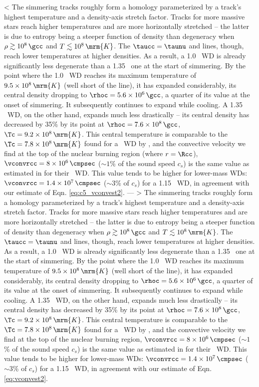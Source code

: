 < The simmering tracks roughly form a homology parameterized by a track's highest temperature and a density-axis stretch factor.  Tracks for more massive stars reach higher temperatures and are more horizontally stretched -- the latter is due to entropy being a steeper function of density than degeneracy when $\rho\gtrsim10^8\,\gcc$ and $T\lesssim10^8\,\mrm{K}$.  The $\taucc = \taunu$ and \citeal{wooswk04} lines, though, reach lower temperatures at higher densities.  As a result, a 1.0 \Msun\ WD is already significantly less degenerate than a 1.35 \Msun\ one at the start of simmering.  By the point where the 1.0 \Msun\ WD reaches its maximum temperature of $9.5\times10^8\,\mrm{K}$ (well short of the \citeal{wooswk04} line), it has expanded considerably, its central density dropping to $\rhoc = 5.6\times10^6\,\gcc$, a quarter of its value at the onset of simmering.  It subsequently continues to expand while cooling.  A 1.35 \Msun\ WD, on the other hand, expands much less drastically -- its central density has decreased by 35\% by its \citeal{wooswk04} point at $\rhoc = 7.6\times10^8\,\gcc$, $\Tc = 9.2\times10^8\,\mrm{K}$.  This central temperature is comparable to the $\Tc = 7.8\times10^8\,\mrm{K}$ found for a \Mch\ WD by \citeal{wooswk04}, and the convective velocity we find at the top of the nuclear burning region (where $r = \Rcc$), $\vconvrcc = 8\times10^6\,\cmpsec$ ($\sim1$\% of the sound speed $c_s$) is the same value as estimated in \citeal{wooswk04} for their \Mch\ WD.  This value tends to be higher for lower-mass WDs: $\vconvrcc = 1.4\times10^7\,\cmpsec$ ($\sim3$\% of $c_s$) for a 1.15 \Msun\ WD, in agreement with our estimate of Eqn. \ref{eq:c5_vconvest2}.
---
> The simmering tracks roughly form a homology parameterized by a track's highest temperature and a density-axis stretch factor.  Tracks for more massive stars reach higher temperatures and are more horizontally stretched -- the latter is due to entropy being a steeper function of density than degeneracy when $\rho\gtrsim10^8\,\gcc$ and $T\lesssim10^8\,\mrm{K}$.  The $\taucc = \taunu$ and \citeal{wooswk04} lines, though, reach lower temperatures at higher densities.  As a result, a 1.0 \Msun\ WD is already significantly less degenerate than a 1.35 \Msun\ one at the start of simmering.  By the point where the 1.0 \Msun\ WD reaches its maximum temperature of $9.5\times10^8\,\mrm{K}$ (well short of the \citeal{wooswk04} line), it has expanded considerably, its central density dropping to $\rhoc = 5.6\times10^6\,\gcc$, a quarter of its value at the onset of simmering.  It subsequently continues to expand while cooling.  A 1.35 \Msun\ WD, on the other hand, expands much less drastically -- its central density has decreased by 35\% by its \citeal{wooswk04} point at $\rhoc = 7.6\times10^8\,\gcc$, $\Tc = 9.2\times10^8\,\mrm{K}$.  This central temperature is comparable to the $\Tc = 7.8\times10^8\,\mrm{K}$ found for a \Mch\ WD by \citeal{wooswk04}, and the convective velocity we find at the top of the nuclear burning region, $\vconvrcc = 8\times10^6\,\cmpsec$ ($\sim1$\% of the sound speed $c_s$) is the same value as estimated in \citeal{wooswk04} for their \Mch\ WD.  This value tends to be higher for lower-mass WDs: $\vconvrcc = 1.4\times10^7\,\cmpsec$ ($\sim3$\% of $c_s$) for a 1.15 \Msun\ WD, in agreement with our estimate of Eqn. \ref{eq:vconvest2}.
